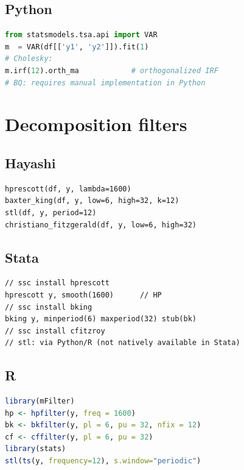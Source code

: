 \subsection*{Python}

\begin{lstlisting}[language=Python, basicstyle=\ttfamily\small,
  frame=single, numbers=none, backgroundcolor=\color{codbg},
  keywordstyle=\color{keyword}\bfseries,
  stringstyle=\color{string},
  commentstyle=\color{comment}\itshape]
from statsmodels.tsa.api import VAR
m  = VAR(df[['y1', 'y2']]).fit(1)
# Cholesky:
m.irf(12).orth_ma            # orthogonalized IRF
# BQ: requires manual implementation in Python
\end{lstlisting}

\section{Decomposition filters}

\subsection*{Hayashi}

\begin{lstlisting}
hprescott(df, y, lambda=1600)
baxter_king(df, y, low=6, high=32, k=12)
stl(df, y, period=12)
christiano_fitzgerald(df, y, low=6, high=32)
\end{lstlisting}

\subsection*{Stata}

\begin{lstlisting}[language={}, basicstyle=\ttfamily\small,
  frame=single, numbers=none, backgroundcolor=\color{codbg}]
// ssc install hprescott
hprescott y, smooth(1600)      // HP
// ssc install bking
bking y, minperiod(6) maxperiod(32) stub(bk)
// ssc install cfitzroy
// stl: via Python/R (not natively available in Stata)
\end{lstlisting}

\subsection*{R}

\begin{lstlisting}[language=R, basicstyle=\ttfamily\small,
  frame=single, numbers=none, backgroundcolor=\color{codbg},
  keywordstyle=\color{keyword}\bfseries,
  stringstyle=\color{string},
  commentstyle=\color{comment}\itshape]
library(mFilter)
hp <- hpfilter(y, freq = 1600)
bk <- bkfilter(y, pl = 6, pu = 32, nfix = 12)
cf <- cffilter(y, pl = 6, pu = 32)
library(stats)
stl(ts(y, frequency=12), s.window="periodic")
\end{lstlisting}

